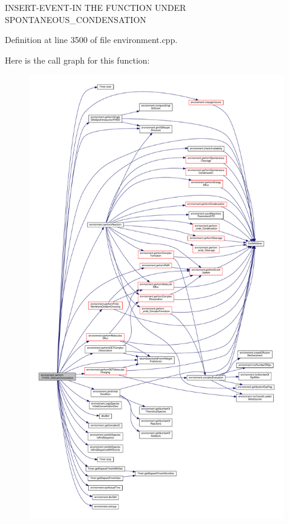 I\-N\-S\-E\-R\-T-\/\-E\-V\-E\-N\-T-\/\-I\-N T\-H\-E F\-U\-N\-C\-T\-I\-O\-N U\-N\-D\-E\-R S\-P\-O\-N\-T\-A\-N\-E\-O\-U\-S\-\_\-\-C\-O\-N\-D\-E\-N\-S\-A\-T\-I\-O\-N 

Definition at line 3500 of file environment.\-cpp.



Here is the call graph for this function\-:\nopagebreak
\begin{figure}[H]
\begin{center}
\leavevmode
\includegraphics[height=550pt]{a00003_a847f333ec6acea11f2d0fc99bab52586_cgraph}
\end{center}
\end{figure}


